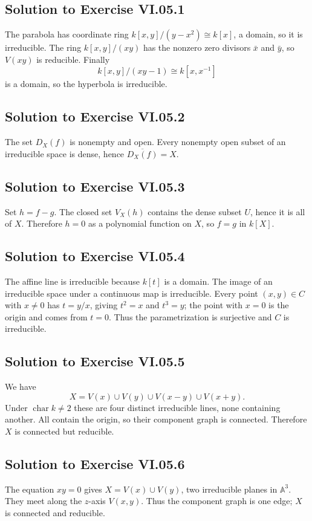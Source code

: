 
\subsection*{Solution to Exercise VI.05.1}
The parabola has coordinate ring \(k[x,y]/(y-x^2)\cong k[x]\), a domain, so it is
irreducible.  The ring \(k[x,y]/(xy)\) has the nonzero zero divisors \(\bar x\) and
\(\bar y\), so \(V(xy)\) is reducible.  Finally
\[
k[x,y]/(xy-1)\cong k[x,x^{-1}]
\]
is a domain, so the hyperbola is irreducible.

\subsection*{Solution to Exercise VI.05.2}
The set \(D_X(f)\) is nonempty and open.  Every nonempty open subset of an irreducible
space is dense, hence \(\overline{D_X(f)}=X\).

\subsection*{Solution to Exercise VI.05.3}
Set \(h=f-g\).  The closed set \(V_X(h)\) contains the dense subset \(U\), hence it is all
of \(X\).  Therefore \(h=0\) as a polynomial function on \(X\), so \(f=g\) in \(k[X]\).

\subsection*{Solution to Exercise VI.05.4}
The affine line is irreducible because \(k[t]\) is a domain.  The image of an irreducible
space under a continuous map is irreducible.  Every point \((x,y)\in C\) with \(x\neq0\)
has \(t=y/x\), giving \(t^2=x\) and \(t^3=y\); the point with \(x=0\) is the origin and
comes from \(t=0\).  Thus the parametrization is surjective and \(C\) is irreducible.

\subsection*{Solution to Exercise VI.05.5}
We have
\[
X=V(x)\cup V(y)\cup V(x-y)\cup V(x+y).
\]
Under \(\operatorname{char}k\neq2\) these are four distinct irreducible lines, none
containing another.  All contain the origin, so their component graph is connected.
Therefore \(X\) is connected but reducible.

\subsection*{Solution to Exercise VI.05.6}
The equation \(xy=0\) gives \(X=V(x)\cup V(y)\), two irreducible planes in
\(\mathbb A^3\).  They meet along the \(z\)-axis \(V(x,y)\).  Thus the component graph is
one edge; \(X\) is connected and reducible.

